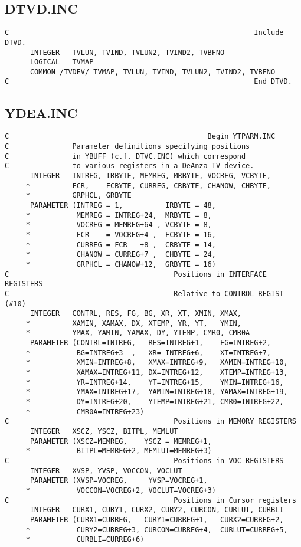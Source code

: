 \subsection{DTVD.INC}
\begin{verbatim}
C                                                          Include DTVD.
      INTEGER   TVLUN, TVIND, TVLUN2, TVIND2, TVBFNO
      LOGICAL   TVMAP
      COMMON /TVDEV/ TVMAP, TVLUN, TVIND, TVLUN2, TVIND2, TVBFNO
C                                                          End DTVD.
\end{verbatim}


\subsection{YDEA.INC}
\begin{verbatim}
C                                               Begin YTPARM.INC
C               Parameter definitions specifying positions
C               in YBUFF (c.f. DTVC.INC) which correspond
C               to various registers in a DeAnza TV device.
      INTEGER   INTREG, IRBYTE, MEMREG, MRBYTE, VOCREG, VCBYTE,
     *          FCR,    FCBYTE, CURREG, CRBYTE, CHANOW, CHBYTE,
     *          GRPHCL, GRBYTE
      PARAMETER (INTREG = 1,          IRBYTE = 48,
     *           MEMREG = INTREG+24,  MRBYTE = 8,
     *           VOCREG = MEMREG+64 , VCBYTE = 8,
     *           FCR    = VOCREG+4 ,  FCBYTE = 16,
     *           CURREG = FCR   +8 ,  CRBYTE = 14,
     *           CHANOW = CURREG+7 ,  CHBYTE = 24,
     *           GRPHCL = CHANOW+12,  GRBYTE = 16)
C                                       Positions in INTERFACE REGISTERS
C                                       Relative to CONTROL REGIST (#10)
      INTEGER   CONTRL, RES, FG, BG, XR, XT, XMIN, XMAX,
     *          XAMIN, XAMAX, DX, XTEMP, YR, YT,   YMIN,
     *          YMAX, YAMIN, YAMAX, DY, YTEMP, CMR0, CMR0A
      PARAMETER (CONTRL=INTREG,   RES=INTREG+1,    FG=INTREG+2,
     *           BG=INTREG+3  ,   XR= INTREG+6,    XT=INTREG+7,
     *           XMIN=INTREG+8,   XMAX=INTREG+9,   XAMIN=INTREG+10,
     *           XAMAX=INTREG+11, DX=INTREG+12,    XTEMP=INTREG+13,
     *           YR=INTREG+14,    YT=INTREG+15,    YMIN=INTREG+16,
     *           YMAX=INTREG+17,  YAMIN=INTREG+18, YAMAX=INTREG+19,
     *           DY=INTREG+20,    YTEMP=INTREG+21, CMR0=INTREG+22,
     *           CMR0A=INTREG+23)
C                                       Positions in MEMORY REGISTERS
      INTEGER   XSCZ, YSCZ, BITPL, MEMLUT
      PARAMETER (XSCZ=MEMREG,    YSCZ = MEMREG+1,
     *           BITPL=MEMREG+2, MEMLUT=MEMREG+3)
C                                       Positions in VOC REGISTERS
      INTEGER   XVSP, YVSP, VOCCON, VOCLUT
      PARAMETER (XVSP=VOCREG,     YVSP=VOCREG+1,
     *           VOCCON=VOCREG+2, VOCLUT=VOCREG+3)
C                                       Positions in Cursor registers
      INTEGER   CURX1, CURY1, CURX2, CURY2, CURCON, CURLUT, CURBLI
      PARAMETER (CURX1=CURREG,   CURY1=CURREG+1,   CURX2=CURREG+2,
     *           CURY2=CURREG+3, CURCON=CURREG+4,  CURLUT=CURREG+5,
     *           CURBLI=CURREG+6)
\end{verbatim}

